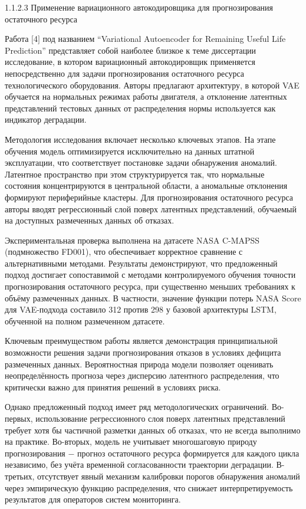 \documentclass[14pt, a4paper, oneside]{extreport}
\begin{document}
\vspace{1em}
1.1.2.3 Применение вариационного автокодировщика для прогнозирования остаточного ресурса
\vspace{1em}

Работа $[$4$]$ под названием “Variational Autoencoder for Remaining Useful Life Prediction” представляет собой наиболее близкое к теме диссертации исследование, в котором вариационный автокодировщик применяется непосредственно для задачи прогнозирования остаточного ресурса технологического оборудования. Авторы предлагают архитектуру, в которой VAE обучается на нормальных режимах работы двигателя, а отклонение латентных представлений тестовых данных от распределения нормы используется как индикатор деградации.

Методология исследования включает несколько ключевых этапов. На этапе обучения модель оптимизируется исключительно на данных штатной эксплуатации, что соответствует постановке задачи обнаружения аномалий. Латентное пространство при этом структурируется так, что нормальные состояния концентрируются в центральной области, а аномальные отклонения формируют периферийные кластеры. Для прогнозирования остаточного ресурса авторы вводят регрессионный слой поверх латентных представлений, обучаемый на доступных размеченных данных об отказах.

Экспериментальная проверка выполнена на датасете NASA C-MAPSS (подмножество FD001), что обеспечивает корректное сравнение с альтернативными методами. Результаты демонстрируют, что предложенный подход достигает сопоставимой с методами контролируемого обучения точности прогнозирования остаточного ресурса, при существенно меньших требованиях к объёму размеченных данных. В частности, значение функции потерь NASA Score для VAE-подхода составило 312 против 298 у базовой архитектуры LSTM, обученной на полном размеченном датасете.

Ключевым преимуществом работы является демонстрация принципиальной возможности решения задачи прогнозирования отказов в условиях дефицита размеченных данных. Вероятностная природа модели позволяет оценивать неопределённость прогноза через дисперсию латентного распределения, что критически важно для принятия решений в условиях риска.

Однако предложенный подход имеет ряд методологических ограничений. Во-первых, использование регрессионного слоя поверх латентных представлений требует хотя бы частичной разметки данных об отказах, что не всегда выполнимо на практике. Во-вторых, модель не учитывает многошаговую природу прогнозирования $-$ прогноз остаточного ресурса формируется для каждого цикла независимо, без учёта временной согласованности траектории деградации. В-третьих, отсутствует явный механизм калибровки порогов обнаружения аномалий через эмпирическую функцию распределения, что снижает интерпретируемость результатов для операторов систем мониторинга.
\end{document}
